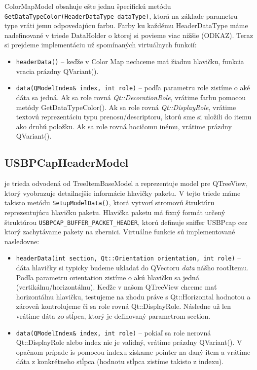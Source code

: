 ColorMapModel obsahuje ešte jednu špecifickú metódu \texttt{GetDataTypeColor(HeaderDataType dataType)}, ktorá na základe parametru type vráti jemu odpovedajúcu farbu. Farby ku každému HeaderDataType máme nadefinované v triede DataHolder o ktorej si povieme viac nižšie (ODKAZ). Teraz si prejdeme implementáciu už spomínaných virtuálnych funkcií:
\begin{itemize}
\item \texttt{headerData()} -- keďže v Color Map nechceme mať žiadnu hlavičku, funkcia vracia prázdny QVariant().
\item \texttt{data(QModelIndex\& index, int role)} -- podľa parametru role zistíme o aké dáta sa jedná. Ak sa role rovná \textit{Qt::DecorationRole}, vrátime farbu pomocou metódy GetDataTypeColor(). Ak sa role rovná \textit{Qt::DisplayRole}, vrátime textovú reprezentáciu typu prenosu/descriptoru, ktorú sme si uložili do itemu ako druhú položku. Ak sa role rovná hocičomu inému, vrátime prázdny QVariant().
\end{itemize}


\subsection{USBPCapHeaderModel}
je trieda odvodená od TreeItemBaseModel a reprezentuje model pre QTreeView, ktorý vyobrazuje detailnejšie informácie hlavičky paketu. V tejto triede máme takisto metódu \texttt{SetupModelData()}, ktorá vytvorí stromovú štruktúru reprezentujúcu hlavičku paketu. Hlavička paketu má fixný formát určený štruktúrou \texttt{USBPCAP\_BUFFER\_PACKET\_HEADER}, ktorú definuje sniffer USBPcap cez ktorý zachytávame pakety na zbernici.
Virtuálne funkcie sú implementované nasledovne:
\begin{itemize}
\label{kap04:sec:usbh_virt}
\item \texttt{headerData(int section, Qt::Orientation orientation, int role)} -- dáta hlavičky si typicky budeme ukladať do QVectoru \textit{data} nášho rootItemu. Podľa parametru orientation zistíme o akú hlavičku sa jedná (vertikálnu/horizontálnu). Keďže v našom QTreeView chceme mať horizontálnu hlavičku, testujeme na zhodu práve s Qt::Horizontal hodnotou a zároveň kontrolujeme či sa role rovná Qt::DisplayRole. Následne už len vrátime dáta zo stĺpca, ktorý je definovaný parametrom section.
\item \texttt{data(QModelIndex\& index, int role)} -- pokiaľ sa role nerovná Qt::DisplayRole alebo index nie je validný, vrátime prázdny QVariant(). V opačnom prípade is pomocou indexu získame pointer na daný item a vrátime dáta z konkrétneho stĺpca (hodnotu stĺpca zistíme takisto z indexu).
\end{itemize}

